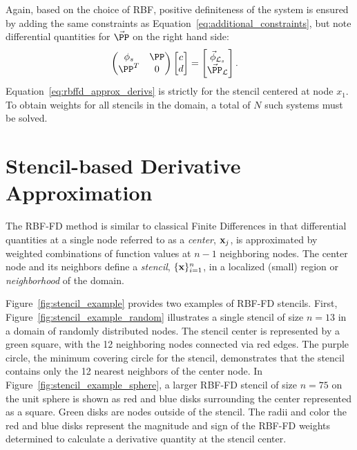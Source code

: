 \documentclass{report}
\begin{document}
{	
Again, based on the choice of RBF, positive definiteness of the system is ensured by adding the same constraints as Equation~\ref{eq:additional_constraints}, but note differential quantities for $\vec{\PP}$ on the right hand side: 
	\begin{align}
		\begin{pmatrix}
		\phi_s & \PP \\
		\PP^T & 0
		\end{pmatrix} \begin{bmatrix}
							c \\ 
							d
							\end{bmatrix}
				 &= \begin{bmatrix}
							\vec{\phi}_{\diffop{}_s} \\
							\vec{\PP}_{\diffop{}}
							 \end{bmatrix}.
	\end{align}
Equation~\ref{eq:rbffd_approx_derivs} is strictly for the stencil centered at node $x_1$. To obtain weights for all stencils in the domain, a total of $N$ such systems must be solved. %





\section{Stencil-based Derivative Approximation}

The RBF-FD method is similar to classical Finite Differences in that differential quantities at a single node referred to as a \emph{center}, $\mathbf{x}_{j}$, is approximated by weighted combinations of function values at $n-1$ neighboring nodes. The center node and its neighbors define a \emph{stencil}, $\{\mathbf{x}\}_{i=1}^{n}$, in a localized (small) region or \emph{neighborhood} of the domain. 

Figure~\ref{fig:stencil_example} provides two examples of RBF-FD stencils. First, Figure~\ref{fig:stencil_example_random} illustrates a single stencil of size $n=13$ in a domain of randomly distributed nodes. The stencil center is represented by a green square, with the 12 neighboring nodes connected via red edges. The purple circle, the minimum covering circle for the stencil, demonstrates that the stencil contains only the 12 nearest neighbors of the center node. In Figure~\ref{fig:stencil_example_sphere}, a larger RBF-FD stencil of size $n=75$ on the unit sphere is shown as red and blue disks surrounding the center represented as a square. Green disks are nodes outside of the stencil. The radii and color the red and blue disks represent the magnitude and sign of the RBF-FD weights determined to calculate a derivative quantity at the stencil center. 

}
\end{document}
